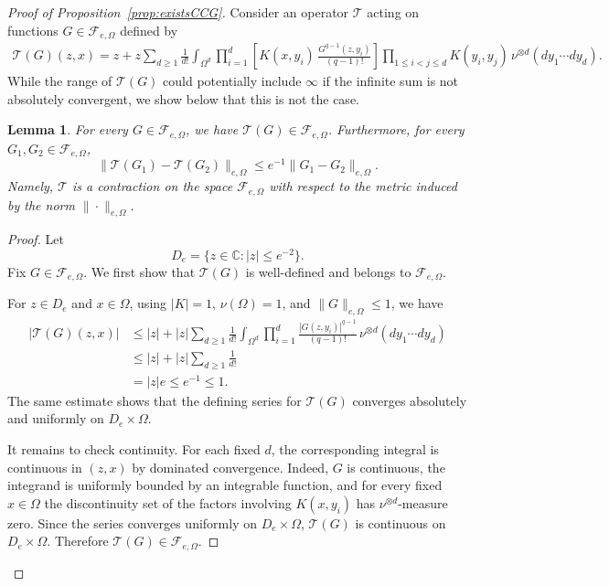 \documentclass[12pt]{article}
\newtheorem{lemma}[theorem]{Lemma}
\newcommand{\cT}{\mathcal{T}}
\begin{document}
\begin{proof}[Proof of Proposition~\ref{prop:existsCCG}]
Consider an operator $\cT$ acting on functions $G\in \mathcal{F}_{e,\Omega}$ defined by
\begin{align*}
 \cT(G)(z,x)=z+z\sum_{d\geq 1}\frac{1}{d!}\int_{\Omega^d}\prod_{i=1}^d
 \left[K(x,y_i)\,\frac{G^{q-1}(z,y_i)}{(q-1)!}\right]
\prod_{1\leq i<j\leq d} K(y_i,y_j)\,\nu^{\otimes d}(dy_1\cdots dy_d).
\end{align*}
While the range of $\cT(G)$ could potentially include $\infty$ if the infinite sum is not absolutely convergent, we show below that this is not the case.
\begin{lemma}\label{lemma:T-bounded-contraction}
For every $G\in \mathcal{F}_{e,\Omega}$, we have $\mathcal{T}(G)\in \mathcal{F}_{e,\Omega}$. Furthermore, for every $G_1,G_2\in\mathcal{F}_{e,\Omega}$,
\begin{equation}
\| \mathcal{T}(G_1)-\mathcal{T}(G_2)\|_{e,\Omega}
\le e^{-1}\| G_1-G_2\|_{e,\Omega}. \label{eq:T-contraction}
\end{equation}
Namely, $\mathcal{T}$ is a contraction on the space $\mathcal{F}_{e,\Omega}$ with respect to the metric induced by the norm $\|\cdot\|_{e,\Omega}$.
\end{lemma}

\begin{proof}
Let
\begin{equation*}
D_e=\{z\in\mathbb C: |z|\le e^{-2}\}.
\end{equation*}
Fix $G\in \mathcal{F}_{e,\Omega}$. We first show that $\mathcal T(G)$ is well-defined and belongs to $\mathcal F_{e,\Omega}$.

For $z\in D_e$ and $x\in\Omega$, using $|K|=1$, $\nu(\Omega)=1$, and $\|G\|_{e,\Omega}\le 1$, we have
\begin{align*}
|\mathcal{T}(G)(z,x)|
&\le |z|
+
|z|\sum_{d\geq 1}\frac{1}{d!}
\int_{\Omega^d}
\prod_{i=1}^d
\frac{|G(z,y_i)|^{q-1}}{(q-1)!}
\,\nu^{\otimes d}(dy_1\cdots dy_d)\\
&\le |z|
+
|z|\sum_{d\geq 1}\frac{1}{d!}\\
&= |z|e \le e^{-1} \le 1.
\end{align*}
The same estimate shows that the defining series for $\mathcal T(G)$ converges absolutely and uniformly on $D_e\times\Omega$.

It remains to check continuity. For each fixed $d$, the corresponding integral is continuous in $(z,x)$ by dominated convergence. Indeed, $G$ is continuous, the integrand is uniformly bounded by an integrable function, and for every fixed $x\in\Omega$ the discontinuity set of the factors involving $K(x,y_i)$ has $\nu^{\otimes d}$-measure zero. Since the series converges uniformly on $D_e\times\Omega$, $\mathcal T(G)$ is continuous on $D_e\times\Omega$. Therefore $\mathcal T(G)\in\mathcal F_{e,\Omega}$.


\end{proof}
\end{proof}
\end{document}
